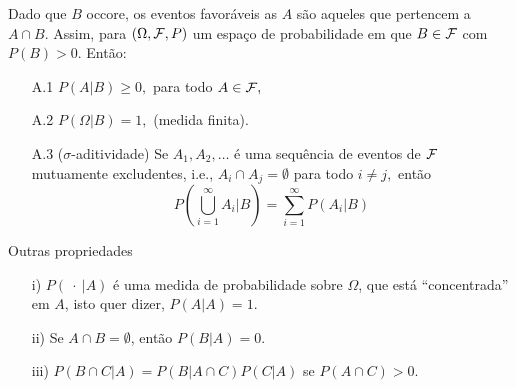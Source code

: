 \begin{frame}
 \begin{teo}
 Dado que $B$ occore, os eventos favoráveis as $A$ são aqueles que pertencem a $A\cap B.$ Assim, para $(\Omega ,{\cal F}, P)$ um espaço de probabilidade em que $B\in {\cal F}$ com $ P(B)>0$. Então:

\begin{enumerate}
\item[A.1]$P(A|B)\geq 0,$ para todo $ A\in {\cal F},$
\item[A.2] $P(\Omega|B)=1,$ (medida finita).
\item[A.3] ($\sigma$-aditividade) Se $A_1, A_2, \ldots$ é uma sequência de eventos de
${\cal F}$  mutuamente excludentes, i.e., $A_i\cap A_j=\emptyset$ para todo
$i\neq j,$ então 
$$
\displaystyle
\label{ax3}
P\left(\bigcup_{i=1}^\infty A_i \Big | B \right)=\sum_{i=1}^\infty P(A_i|B)
$$
\end{enumerate}
\end{teo}
\begin{block}{Outras propriedades}
\begin{itemize}

\item[i)]$P(\ \cdot \ |A)$ é uma medida de probabilidade sobre $\Omega $, que está 
``concentrada'' em $A$, isto quer dizer, $P(A|A)=1$.

\item[ii)] Se $A\cap B=\emptyset $, então  $P(B|A)=0.$

 \item[iii)] $P(B\cap C|A)=P(B|A\cap C)P(C|A)$ se $P(A \cap C)>0.$ 
% 
\end{itemize}
\end{block}

\end{frame}

